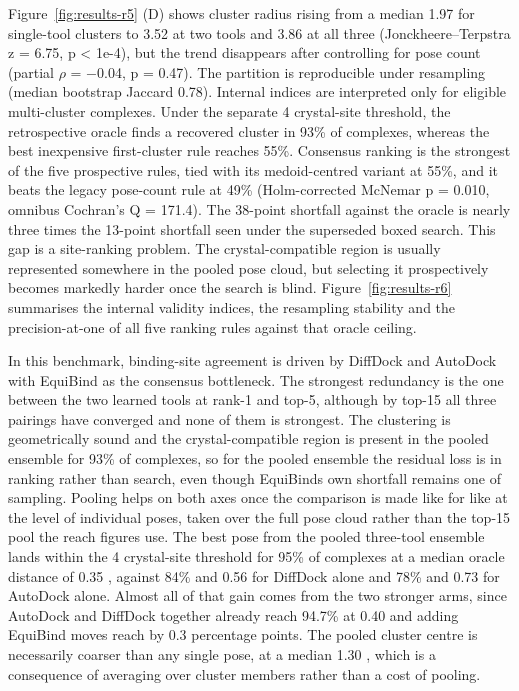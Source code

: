 Figure~\ref{fig:results-r5} (D) shows cluster radius rising from a median 1.97 \angstrom{} for single-tool clusters to 3.52 \angstrom{} at two tools and 3.86 \angstrom{} at all three (Jonckheere--Terpstra z = 6.75, p \textless{} 1e-4), but the trend disappears after controlling for pose count (partial \ensuremath{\rho} = \ensuremath{-}0.04, p = 0.47). The partition is reproducible under resampling (median bootstrap Jaccard 0.78). Internal indices are interpreted only for eligible multi-cluster complexes. Under the separate 4 \angstrom{} crystal-site threshold, the retrospective oracle finds a recovered cluster in 93\% of complexes, whereas the best inexpensive first-cluster rule reaches 55\%. Consensus ranking is the strongest of the five prospective rules, tied with its medoid-centred variant at 55\%, and it beats the legacy pose-count rule at 49\% (Holm-corrected McNemar p = 0.010, omnibus Cochran's Q = 171.4). The 38-point shortfall against the oracle is nearly three times the 13-point shortfall seen under the superseded boxed search. This gap is a site-ranking problem. The crystal-compatible region is usually represented somewhere in the pooled pose cloud, but selecting it prospectively becomes markedly harder once the search is blind. Figure~\ref{fig:results-r6} summarises the internal validity indices, the resampling stability and the precision-at-one of all five ranking rules against that oracle ceiling.

In this benchmark, binding-site agreement is driven by DiffDock and AutoDock with EquiBind as the consensus bottleneck. The strongest redundancy is the one between the two learned tools at rank-1 and top-5, although by top-15 all three pairings have converged and none of them is strongest. The clustering is geometrically sound and the crystal-compatible region is present in the pooled ensemble for 93\% of complexes, so for the pooled ensemble the residual loss is in ranking rather than search, even though EquiBind\textquotesingle s own shortfall remains one of sampling. Pooling helps on both axes once the comparison is made like for like at the level of individual poses, taken over the full pose cloud rather than the top-15 pool the reach figures use. The best pose from the pooled three-tool ensemble lands within the 4 \angstrom{} crystal-site threshold for 95\% of complexes at a median oracle distance of 0.35 \angstrom{}, against 84\% and 0.56 \angstrom{} for DiffDock alone and 78\% and 0.73 \angstrom{} for AutoDock alone. Almost all of that gain comes from the two stronger arms, since AutoDock and DiffDock together already reach 94.7\% at 0.40 \angstrom{} and adding EquiBind moves reach by 0.3 percentage points. The pooled cluster centre is necessarily coarser than any single pose, at a median 1.30 \angstrom{}, which is a consequence of averaging over cluster members rather than a cost of pooling.

